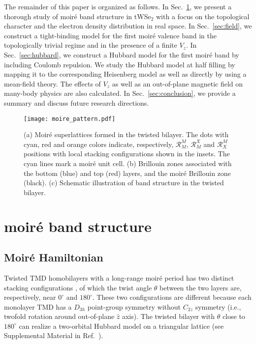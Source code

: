 \documentclass[aps,prx,floatfix,twocolumn]{revtex4-1}
\begin{document}
	The remainder of this paper is organized as follows. 
	In Sec.~\ref{sec:moire}, we present a thorough study of moir\'e band structure in tWSe$_2$ with a focus on the topological character and the electron density distribution in real space.
	In Sec.~\ref{sec:field}, we construct a tight-binding model for the first moir\'e valence band in the topologically trivial regime and in the presence of a finite $V_z$. 
	In Sec.~\ref{sec:hubbard}, we construct a Hubbard model for the first moir\'e band by including Coulomb repulsion. We study the Hubbard model at half filling by mapping it to the corresponding Heisenberg model as well as directly by using a mean-field theory. The effects of $V_z$ as well as an out-of-plane magnetic field on many-body physics are also calculated. In Sec.~\ref{sec:conclusion}, we provide a summary and discuss future research directions.
	
		\begin{figure}[t!]
		\texttt{[image: moire\_pattern.pdf]}
		\caption{(a) Moir\'e superlattices formed in the twisted bilayer. The dots with cyan, red and orange colors indicate, respectively, $\mathcal{R}_{M}^{M}$, $\mathcal{R}_{M}^{X}$ and $\mathcal{R}_{X}^{M}$ positions  with local stacking configurations shown in the insets. The cyan lines mark a moir\'e unit cell. (b) Brillouin zones associated with the bottom (blue) and top (red) layers, and  the moir\'e Brillouin zone (black). (c) Schematic illustration of band structure in the twisted bilayer.}	
		\label{fig:moire_pattern}
	\end{figure}
	
	\section{moir\'e band structure}
	\label{sec:moire}
	
	\subsection{Moir\'e Hamiltonian}
	
	Twisted TMD homobilayers  with a long-range moir\'e period has two distinct stacking configurations \cite{wu2019topological}, of which the twist angle $\theta$ between the two layers are, respectively, near $0^{\circ}$ and $180^{\circ}$. These two configurations are different because each monolayer TMD has a $D_{3h}$ point-group symmetry without $C_{2z}$ symmetry (i.e., twofold rotation around out-of-plane $\hat{z}$ axis). The twisted bilayer with $\theta$ close to $180^{\circ}$ can realize a two-orbital Hubbard model on a triangular lattice (see Supplemental Material in Ref.~). 
	
\end{document}
